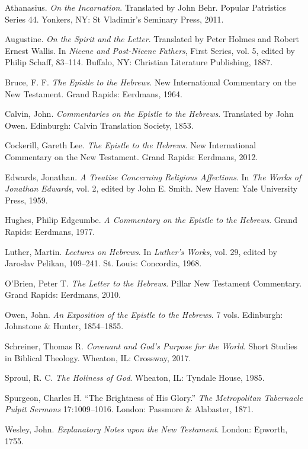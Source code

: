 \documentclass[12pt]{article}
\begin{document}
\begin{thebibliography}{}
Athanasius. \emph{On the Incarnation}. Translated by John Behr. Popular
Patristics Series 44. Yonkers, NY: St Vladimir’s Seminary Press, 2011.

Augustine. \emph{On the Spirit and the Letter}. Translated by Peter Holmes and
Robert Ernest Wallis. In \emph{Nicene and Post-Nicene Fathers}, First Series,
vol. 5, edited by Philip Schaff, 83--114. Buffalo, NY: Christian Literature
Publishing, 1887.

Bruce, F. F. \emph{The Epistle to the Hebrews}. New International Commentary on
the New Testament. Grand Rapids: Eerdmans, 1964.

Calvin, John. \emph{Commentaries on the Epistle to the Hebrews}. Translated by
John Owen. Edinburgh: Calvin Translation Society, 1853.

Cockerill, Gareth Lee. \emph{The Epistle to the Hebrews}. New International
Commentary on the New Testament. Grand Rapids: Eerdmans, 2012.

Edwards, Jonathan. \emph{A Treatise Concerning Religious Affections}. In
\emph{The Works of Jonathan Edwards}, vol. 2, edited by John E. Smith. New
Haven: Yale University Press, 1959.

Hughes, Philip Edgcumbe. \emph{A Commentary on the Epistle to the Hebrews}.
Grand Rapids: Eerdmans, 1977.

Luther, Martin. \emph{Lectures on Hebrews}. In \emph{Luther’s Works}, vol. 29,
edited by Jaroslav Pelikan, 109--241. St. Louis: Concordia, 1968.

O’Brien, Peter T. \emph{The Letter to the Hebrews}. Pillar New Testament
Commentary. Grand Rapids: Eerdmans, 2010.

Owen, John. \emph{An Exposition of the Epistle to the Hebrews}. 7 vols.
Edinburgh: Johnstone \& Hunter, 1854--1855.

Schreiner, Thomas R. \emph{Covenant and God’s Purpose for the World}. Short
Studies in Biblical Theology. Wheaton, IL: Crossway, 2017.

Sproul, R. C. \emph{The Holiness of God}. Wheaton, IL: Tyndale House, 1985.

Spurgeon, Charles H. ``The Brightness of His Glory.'' \emph{The Metropolitan
Tabernacle Pulpit Sermons} 17:1009--1016. London: Passmore \& Alabaster, 1871.

Wesley, John. \emph{Explanatory Notes upon the New Testament}. London: Epworth,
1755.
\end{thebibliography}
\end{document}

